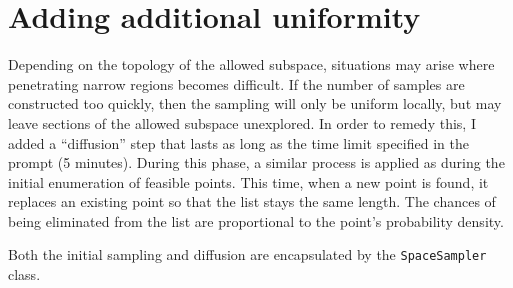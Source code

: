 \documentclass[12pt, fleqn]{article}
\newcommand{\code}[1]{\texttt{#1}}
\begin{document}
\section{Adding additional uniformity}
Depending on the topology of the allowed subspace, situations may arise where penetrating narrow regions becomes difficult.
If the number of samples are constructed too quickly, then the sampling will only be uniform locally, but may leave sections of the allowed subspace unexplored.
In order to remedy this, I added a ``diffusion'' step that lasts as long as the time limit specified in the prompt (5 minutes).
During this phase, a similar process is applied as during the initial enumeration of feasible points.
This time, when a new point is found, it replaces an existing point so that the list stays the same length.
The chances of being eliminated from the list are proportional to the point's probability density.

Both the initial sampling and diffusion are encapsulated by the \code{SpaceSampler} class.
\end{document}
